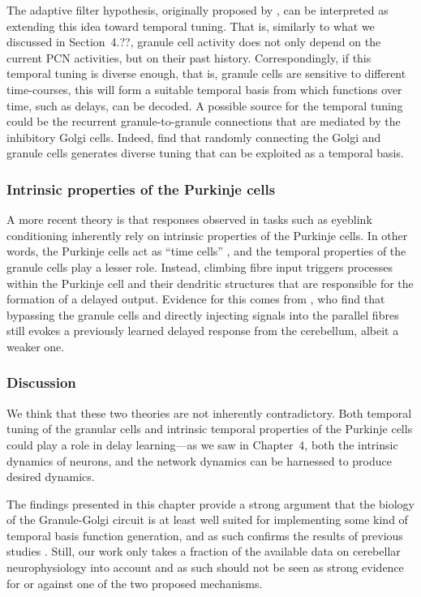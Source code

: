 The adaptive filter hypothesis, originally proposed by \citet{fujita1982adaptive}, can be interpreted as extending this idea toward temporal tuning.
That is, similarly to what we discussed in Section~4.??,
granule cell activity does not only depend on the current PCN activities, but on their past history.
Correspondingly, if this temporal tuning is diverse enough, that is, granule cells are sensitive to different time-courses, this will form a suitable temporal basis from which functions over time, such as delays, can be decoded.
A possible source for the temporal tuning could be the recurrent granule-to-granule connections that are mediated by the inhibitory Golgi cells.
Indeed, \citet{rossert2015edge} find that randomly connecting the Golgi and granule cells generates diverse tuning that can be exploited as a temporal basis.


\subsubsection{Intrinsic properties of the Purkinje cells}
A more recent theory is that responses observed in tasks such as eyeblink conditioning inherently rely on intrinsic properties of the Purkinje cells.
In other words, the Purkinje cells act as \enquote{time cells} \citep{lusk2016cerebellar}, and the temporal properties of the granule cells play a lesser role.
Instead, climbing fibre input triggers processes within the Purkinje cell and their dendritic structures that are responsible for the formation of a delayed output.
Evidence for this comes from \citet{johansson2014memory}, who find that bypassing the granule cells and directly injecting signals into the parallel fibres still evokes a previously learned delayed response from the cerebellum, albeit a weaker one.


\subsubsection{Discussion}
We think that these two theories are not inherently contradictory.
Both temporal tuning of the granular cells and intrinsic temporal properties of the Purkinje cells could play a role in delay learning---as we saw in Chapter~4, both the intrinsic dynamics of neurons, and the network dynamics can be harnessed to produce desired dynamics.

The findings presented in this chapter provide a strong argument that the biology of the Granule-Golgi circuit is at least well suited for implementing some kind of temporal basis function generation, and as such confirms the results of previous studies  \citep[cf.][]{dean2010cerebellar,rossert2015edge}.
Still, our work only takes a fraction of the available data on cerebellar neurophysiology into account and as such should not be seen as strong evidence for or against one of the two proposed mechanisms.
